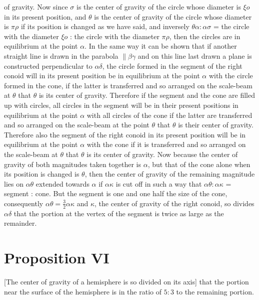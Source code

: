 \documentclass[12pt]{article}
\begin{document}
of gravity.  Now since $\sigma$ is the center of gravity of the circle
whose diameter is $\xi o$ in its present position, and $\theta$ is the
center of gravity of the circle whose diameter is $\pi\rho$ if its
position is changed as we have said, and inversely $\theta\alpha :
\alpha\sigma$ = the circle with the diameter $\xi o$ : the circle with
the diameter $\pi\rho$, then the circles are in equilibrium at the
point $\alpha$.  In the same way it can be shown that if another
straight line is drawn in the parabola $\| \beta\gamma$ and on this
line last drawn a plane is constructed perpendicular to
$\alpha\delta$, the circle formed in the segment of the right conoid
will in its present position be in equilibrium at the point $\alpha$
with the circle formed in the cone, if the latter is transferred and
so arranged on the scale-beam at $\theta$ that $\theta$ is its center
of gravity.  Therefore if the segment and the cone are filled up with
circles, all circles in the segment will be in their present positions
in equilibrium at the point $\alpha$ with all circles of the cone if
the latter are transferred and so arranged on the scale-beam at the
point $\theta$ that $\theta$ is their center of gravity. Therefore
also the segment of the right conoid in its present position will be
in equilibrium at the point $\alpha$ with the cone if it is
transferred and so arranged on the scale-beam at $\theta$ that
$\theta$ is its center of gravity. Now because the center of gravity
of both magnitudes taken together is $\alpha$, but that of the cone
alone when its position is changed is $\theta$, then the center of
gravity of the remaining magnitude lies on $\alpha\theta$ extended
towards $\alpha$ if $\alpha\kappa$ is cut off in such a way that
$\alpha\theta : \alpha\kappa$ = segment : cone. But the segment is one
and one half the size of the cone, consequently $\alpha\theta =
\frac{3}{2}\alpha\kappa$ and $\kappa$, the center of gravity of the
right conoid, so divides $\alpha\delta$ that the portion at the vertex
of the segment is twice as large as the remainder.


\section*{Proposition VI}

[The center of gravity of a hemisphere is so divided on its axis] that
the portion near the surface of the hemisphere is in the ratio of $5 :
3$ to the remaining portion.
\end{document}
